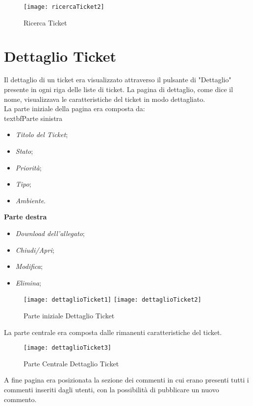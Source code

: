 \begin{figure}[H]
\bigskip
     \texttt{[image: ricercaTicket2]} 
    \caption{Ricerca Ticket}
\end{figure}

\bigskip
\section{Dettaglio Ticket}
Il dettaglio di un ticket era visualizzato attraverso il pulsante di "Dettaglio" presente in ogni riga delle liste di ticket. La pagina di dettaglio, come dice il nome, visualizzava le caratteristiche del ticket in modo dettagliato. \\ 
La parte iniziale della pagina era composta da:\
\medskip
\\textbf{Parte sinistra}
\begin{itemize}
\item \textit{Titolo del Ticket};
\item \textit{Stato};
\item \textit{Priorità};
\item \textit{Tipo};
\item \textit{Ambiente}.
\end{itemize}

\medskip
\noindent
\textbf{Parte destra}
\begin{itemize}
\item \textit{Download dell'allegato};
\item \textit{Chiudi/Apri};
\item \textit{Modifica};
\item \textit{Elimina};
\end{itemize}
\bigskip
\bigskip
\begin{figure}[H]
	\centering
	    \texttt{[image: dettaglioTicket1]} 
     \texttt{[image: dettaglioTicket2]} 
    \caption{Parte iniziale Dettaglio Ticket}
\end{figure}


\noindent
La parte centrale era composta dalle rimanenti caratteristiche del ticket.\\
\bigskip
\begin{figure}[H]
	\centering
    \texttt{[image: dettaglioTicket3]} 
\caption{Parte Centrale Dettaglio Ticket}
\end{figure}

\noindent
A fine pagina era posizionata la sezione dei commenti in cui erano presenti tutti i commenti inseriti dagli utenti, con la possibilità di pubblicare un nuovo commento. 

